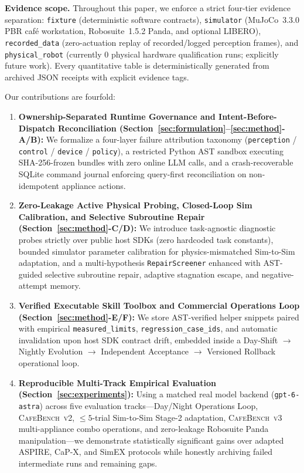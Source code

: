 \documentclass[10pt,journal]{IEEEtran}
\begin{document}
\textbf{Evidence scope.} Throughout this paper, we enforce a strict four-tier evidence separation: \texttt{fixture} (deterministic software contracts), \texttt{simulator} (MuJoCo~3.3.0 PBR café workstation, Robosuite~1.5.2 Panda, and optional LIBERO), \texttt{recorded\_data} (zero-actuation replay of recorded/logged perception frames), and \texttt{physical\_robot} (currently $0$ physical hardware qualification runs; explicitly future work). Every quantitative table is deterministically generated from archived JSON receipts with explicit evidence tags.

Our contributions are fourfold:
\begin{enumerate}
    \item \textbf{Ownership-Separated Runtime Governance and Intent-Before-Dispatch Reconciliation (Section~\ref{sec:formulation}--\ref{sec:method}-A/B):} We formalize a four-layer failure attribution taxonomy (\texttt{perception} / \texttt{control} / \texttt{device} / \texttt{policy}), a restricted Python AST sandbox executing SHA-256-frozen bundles with zero online LLM calls, and a crash-recoverable SQLite command journal enforcing query-first reconciliation on non-idempotent appliance actions.
    \item \textbf{Zero-Leakage Active Physical Probing, Closed-Loop Sim Calibration, and Selective Subroutine Repair (Section~\ref{sec:method}-C/D):} We introduce task-agnostic diagnostic probes strictly over public host SDKs (zero hardcoded task constants), bounded simulator parameter calibration for physics-mismatched Sim-to-Sim adaptation, and a multi-hypothesis \texttt{RepairScreener} enhanced with AST-guided selective subroutine repair, adaptive stagnation escape, and negative-attempt memory.
    \item \textbf{Verified Executable Skill Toolbox and Commercial Operations Loop (Section~\ref{sec:method}-E/F):} We store AST-verified helper snippets paired with empirical \texttt{measured\_limits}, \texttt{regression\_case\_ids}, and automatic invalidation upon host SDK contract drift, embedded inside a Day-Shift $\to$ Nightly Evolution $\to$ Independent Acceptance $\to$ Versioned Rollback operational loop.
    \item \textbf{Reproducible Multi-Track Empirical Evaluation (Section~\ref{sec:experiments}):} Using a matched real model backend (\texttt{gpt-6-astra}) across five evaluation tracks---Day/Night Operations Loop, \textsc{CafeBench~v2}, $\le 5$-trial Sim-to-Sim Stage-2 adaptation, \textsc{CafeBench~v3} multi-appliance combo operations, and zero-leakage Robosuite Panda manipulation---we demonstrate statistically significant gains over adapted ASPIRE, CaP-X, and SimEX protocols while honestly archiving failed intermediate runs and remaining gaps.
\end{enumerate}
\end{document}
